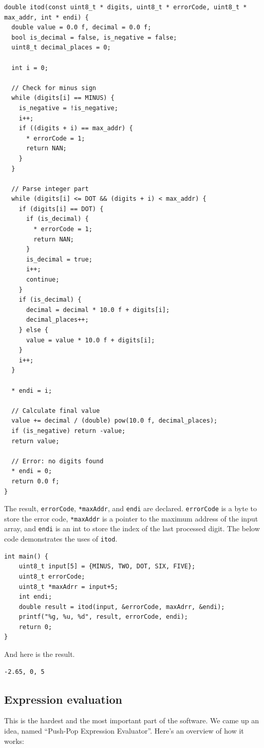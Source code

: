 \documentclass[a4paper, twoside]{report}
\newenvironment{code}{\captionsetup{type=listing}}{}
\begin{document}
\begin{code}
\begin{verbatim}
double itod(const uint8_t * digits, uint8_t * errorCode, uint8_t * max_addr, int * endi) {
  double value = 0.0 f, decimal = 0.0 f;
  bool is_decimal = false, is_negative = false;
  uint8_t decimal_places = 0;

  int i = 0;

  // Check for minus sign
  while (digits[i] == MINUS) {
    is_negative = !is_negative;
    i++;
    if ((digits + i) == max_addr) {
      * errorCode = 1;
      return NAN;
    }
  }

  // Parse integer part
  while (digits[i] <= DOT && (digits + i) < max_addr) {
    if (digits[i] == DOT) {
      if (is_decimal) {
        * errorCode = 1;
        return NAN;
      }
      is_decimal = true;
      i++;
      continue;
    }
    if (is_decimal) {
      decimal = decimal * 10.0 f + digits[i];
      decimal_places++;
    } else {
      value = value * 10.0 f + digits[i];
    }
    i++;
  }

  * endi = i;

  // Calculate final value
  value += decimal / (double) pow(10.0 f, decimal_places);
  if (is_negative) return -value;
  return value;

  // Error: no digits found
  * endi = 0;
  return 0.0 f;
}
\end{verbatim}
\end{code}
The result, \texttt{errorCode}, \texttt{*maxAddr}, and \texttt{endi} are declared. \texttt{errorCode} is a byte to store the error code, \texttt{*maxAddr} is a pointer to the maximum address of the input array, and \texttt{endi} is an int to store the index of the last processed digit. The below code demonstrates the uses of \texttt{itod}.
\begin{verbatim}
int main() {
    uint8_t input[5] = {MINUS, TWO, DOT, SIX, FIVE};
    uint8_t errorCode;
    uint8_t *maxAdrr = input+5;
    int endi;
    double result = itod(input, &errorCode, maxAdrr, &endi);
    printf("%g, %u, %d", result, errorCode, endi);
    return 0;
}
\end{verbatim}
And here is the result.
\begin{verbatim}
-2.65, 0, 5
\end{verbatim}

\subsection{Expression evaluation}
This is the hardest and the most important part of the software. We came up an idea, named ``Push-Pop Expression Evaluator''. Here's an overview of how it works:
\end{document}
